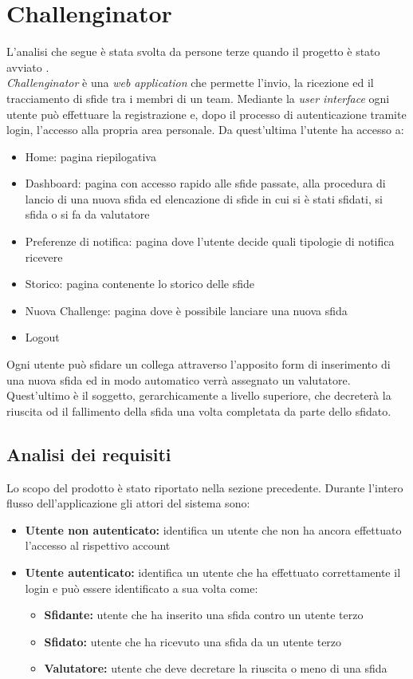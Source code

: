 \chapter{Challenginator}\label{challenginator}

L'analisi che segue è stata svolta da persone terze quando il progetto è stato avviato \cite{canovese}.\\
\textit{Challenginator} è una \textit{web application} che permette l'invio, la ricezione ed il tracciamento di sfide tra i membri di un team. Mediante la \textit{user interface} ogni utente può effettuare la registrazione e, dopo il processo di autenticazione tramite login, l'accesso alla propria area personale.
Da quest'ultima l'utente ha accesso a:
\begin{itemize}
    \item Home: pagina riepilogativa
    \item Dashboard: pagina con accesso rapido alle sfide passate, alla procedura di lancio di una nuova sfida ed elencazione di sfide in cui si è stati sfidati, si sfida o si fa da valutatore
    \item Preferenze di notifica: pagina dove l'utente decide quali tipologie di notifica ricevere
    \item Storico: pagina contenente lo storico delle sfide
    \item Nuova Challenge: pagina dove è possibile lanciare una nuova sfida
    \item Logout
\end{itemize}
Ogni utente può sfidare un collega attraverso l'apposito form di inserimento di una nuova sfida ed in modo automatico verrà assegnato un valutatore. Quest'ultimo è il soggetto, gerarchicamente a livello superiore, che decreterà la riuscita od il fallimento della sfida una volta completata da parte dello sfidato.

\section{Analisi dei requisiti}

Lo scopo del prodotto è stato riportato nella sezione precedente.
Durante l'intero flusso dell'applicazione gli attori del sistema sono:
\begin{itemize}
    \item \textbf{Utente non autenticato:} identifica un utente che non ha ancora effettuato l'accesso al rispettivo account
    \item \textbf{Utente autenticato:} identifica un utente che ha effettuato correttamente il login e può essere identificato a sua volta come:
    \begin{itemize}
        \item \textbf{Sfidante:} utente che ha inserito una sfida contro un utente terzo
        \item \textbf{Sfidato:} utente che ha ricevuto una sfida da un utente terzo
        \item \textbf{Valutatore:} utente che deve decretare la riuscita o meno di una sfida
    \end{itemize}
\end{itemize}

